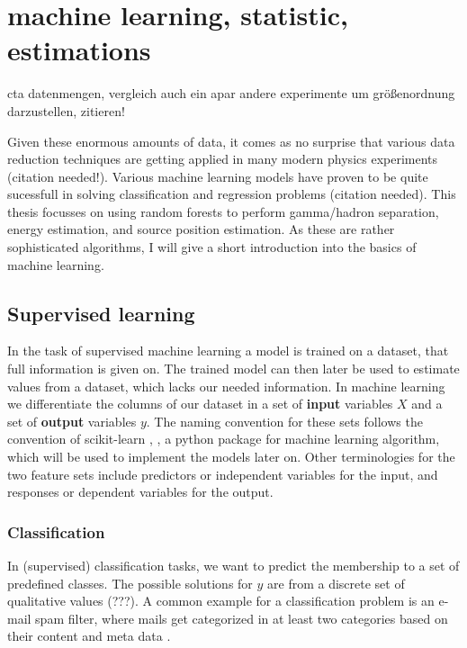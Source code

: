 \chapter{machine learning, statistic, estimations}\label{ml}

cta datenmengen, vergleich auch ein apar andere experimente um größenordnung darzustellen, zitieren!

Given these enormous amounts of data, it comes as no surprise that
various data reduction techniques are getting applied in many modern
physics experiments (citation needed!).
Various machine learning models have proven to be
quite sucessfull in solving classification and
regression problems (citation needed).
This thesis focusses on using random forests to
perform gamma/hadron separation, energy estimation, and
source position estimation.
As these are rather sophisticated algorithms, I will
give a short introduction into the basics of machine learning.

\section{Supervised learning}
In the task of supervised machine learning a model is trained on a
dataset, that full information is given on. The trained model
can then later be used to estimate values from a dataset, which
lacks our needed information. In machine learning we differentiate
the columns of our dataset in a set of \textbf{input} variables $X$ and
a set of \textbf{output} variables $y$. The naming convention for
these sets follows the convention of scikit-learn
\cite{scikit-learn}, \cite{sklearn_api}, a python package for
machine learning algorithm, which will be used to implement the models later on.
Other terminologies for the two feature sets include
predictors or independent variables for the input, and
responses or dependent variables for the output.

\subsection{Classification}
In (supervised) classification tasks, we want to predict the membership to
a set of predefined classes. The possible solutions for $y$
are from a discrete set of qualitative values (???).
A common example for a classification problem is an e-mail spam filter,
where mails get categorized in at least two categories based
on their content and meta data \cite{DBLP:journals/corr/cs-CL-0006013}.

